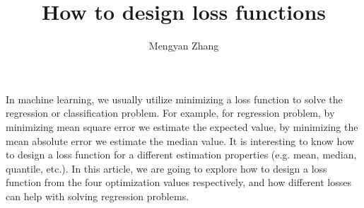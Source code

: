 \documentclass[11pt]{article}
\begin{document}
\author{Mengyan Zhang}
\title{How to design loss functions}
\maketitle

\medskip

In machine learning, we usually utilize minimizing a loss function to solve the regression or classification problem. For example, for regression problem, by minimizing mean square error we estimate the expected value, by minimizing the mean absolute error we estimate the median value. It is interesting to know how to design a loss function for a different estimation properties (e.g. mean, median, quantile, etc.). In this article, we are going to explore how to design a loss function from the four optimization values respectively, and how different losses can help with solving regression problems.
\end{document}
